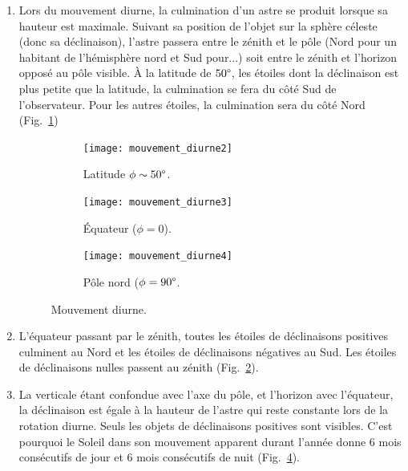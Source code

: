 \documentclass[a4paper,10pt]{report}
\renewcommand{\deg}{\ensuremath{\degree}}
\begin{document}
\begin{Answer}
  \begin{enumerate}
  \item Lors du mouvement diurne, la culmination d'un astre se produit
    lorsque sa hauteur est maximale.  Suivant sa position de l'objet
    sur la sphère céleste (donc sa déclinaison), l'astre passera entre
    le zénith et le pôle (Nord pour un habitant de l'hémisphère nord
    et Sud pour...) soit entre le zénith et l'horizon opposé au pôle
    visible. À la latitude de $50\deg$, les étoiles dont la
    déclinaison est plus petite que la latitude, la culmination se
    fera du côté Sud de l'observateur.  Pour les autres étoiles, la
    culmination sera du côté Nord (Fig.~\ref{mouvementdiurne2})

    \begin{figure}
      \centering
      \begin{subfigure}[b]{0.3\textwidth}
        \centering
        \texttt{[image: mouvement\_diurne2]}
        \caption{Latitude $\phi\sim 50\deg$.}
        \label{mouvementdiurne2}
      \end{subfigure}
      \begin{subfigure}[b]{0.3\textwidth}
        \centering
        \texttt{[image: mouvement\_diurne3]}
        \caption{Équateur ($\phi = 0$).}
        \label{mouvementdiurne3}
      \end{subfigure}
      \begin{subfigure}[b]{0.3\textwidth}
        \centering
        \texttt{[image: mouvement\_diurne4]}
        \caption{Pôle nord ($\phi = 90\deg$.}
        \label{mouvementdiurne4}
      \end{subfigure}
      \caption{Mouvement diurne.}
    \end{figure}

  \item L'équateur passant par le zénith, toutes les étoiles de
    déclinaisons positives culminent au Nord et les étoiles de
    déclinaisons négatives au Sud. Les étoiles de déclinaisons nulles
    passent au zénith (Fig.~\ref{mouvementdiurne3}).

  \item La verticale étant confondue avec l'axe du pôle, et l'horizon
    avec l'équateur, la déclinaison est égale à la hauteur de l'astre
    qui reste constante lors de la rotation diurne.  Seuls les objets
    de déclinaisons positives sont visibles. C'est pourquoi le Soleil
    dans son mouvement apparent durant l'année donne 6 mois
    consécutifs de jour et 6 mois consécutifs de nuit
    (Fig.~\ref{mouvementdiurne4}).
  \end{enumerate}
\end{Answer}
\end{document}
